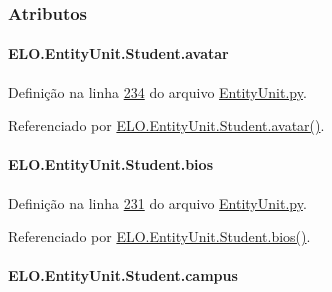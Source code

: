 \subsubsection{Atributos}
\hypertarget{classELO_1_1EntityUnit_1_1Student_a63479fe42a5a5e1dffc988221a807a6a}{
\paragraph[{avatar}]{\setlength{\rightskip}{0pt plus 5cm}E\-L\-O.\-Entity\-Unit.\-Student.\-avatar}}\label{classELO_1_1EntityUnit_1_1Student_a63479fe42a5a5e1dffc988221a807a6a}


Definição na linha \hyperlink{EntityUnit_8py_source_l00234}{234} do arquivo \hyperlink{EntityUnit_8py_source}{Entity\-Unit.\-py}.



Referenciado por \hyperlink{classELO_1_1EntityUnit_1_1Student_adcb290317bcd8aab23370b17c42d26fb}{E\-L\-O.\-Entity\-Unit.\-Student.\-avatar()}.

\hypertarget{classELO_1_1EntityUnit_1_1Student_a148e46f8d5bb2a3dedb9590edbb2471e}{
\paragraph[{bios}]{\setlength{\rightskip}{0pt plus 5cm}E\-L\-O.\-Entity\-Unit.\-Student.\-bios}}\label{classELO_1_1EntityUnit_1_1Student_a148e46f8d5bb2a3dedb9590edbb2471e}


Definição na linha \hyperlink{EntityUnit_8py_source_l00231}{231} do arquivo \hyperlink{EntityUnit_8py_source}{Entity\-Unit.\-py}.



Referenciado por \hyperlink{classELO_1_1EntityUnit_1_1Student_a7428c9fbf91bc28ee039df54fbf613a3}{E\-L\-O.\-Entity\-Unit.\-Student.\-bios()}.

\hypertarget{classELO_1_1EntityUnit_1_1Student_aeff51011a4e35705fb6aefc54e1d4f35}{
\paragraph[{campus}]{\setlength{\rightskip}{0pt plus 5cm}E\-L\-O.\-Entity\-Unit.\-Student.\-campus}}\label{classELO_1_1EntityUnit_1_1Student_aeff51011a4e35705fb6aefc54e1d4f35}


